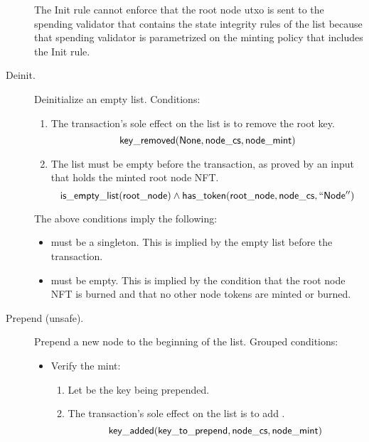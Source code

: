 \documentclass[../midgard.tex]{subfiles}
\begin{document}
\begin{description}
        The Init rule cannot enforce that the root node utxo is sent to the spending validator that contains the state integrity rules of the list because that spending validator is parametrized on the minting policy that includes the Init rule.
        
        \initSpendingValidatorWarning
    \item[Deinit.] Deinitialize an empty list.
      Conditions:
        \begin{enumerate}
            \item The transaction's sole effect on the list is to remove the root key.
                \begin{equation*}
                    \mathsf{key\_removed}(\mathsf{None}, \mathsf{node\_cs}, \mathsf{node\_mint})
                \end{equation*}
            
            \item The list must be empty before the transaction, as proved by an input  that holds the minted root node NFT.
                \begin{equation*}
                    \mathsf{is\_empty\_list}(\mathsf{root\_node}) \land
                    \mathsf{has\_token}(\mathsf{root\_node}, \mathsf{node\_cs}, \mathsf{``Node''})
                \end{equation*}
        \end{enumerate}
        The above conditions imply the following:
        \begin{itemize}
            \item {} must be a singleton.
              This is implied by the empty list before the transaction.
            \item {} must be empty.
              This is implied by the condition that the root node NFT is burned and that no other node tokens are minted or burned.
        \end{itemize}

    \item[Prepend (unsafe).] Prepend a new node to the beginning of the list.
      Grouped conditions:
        \begin{itemize}
            \item Verify the mint: 
            \begin{enumerate}
                \item Let  be the key being prepended.
                \item The transaction's sole effect on the list is to add .
                    \begin{equation*}
                        \mathsf{key\_added}(\mathsf{key\_to\_prepend}, \mathsf{node\_cs}, \mathsf{node\_mint})
                    \end{equation*}
            \end{enumerate}
            

\end{itemize}
\end{description}
\end{document}
